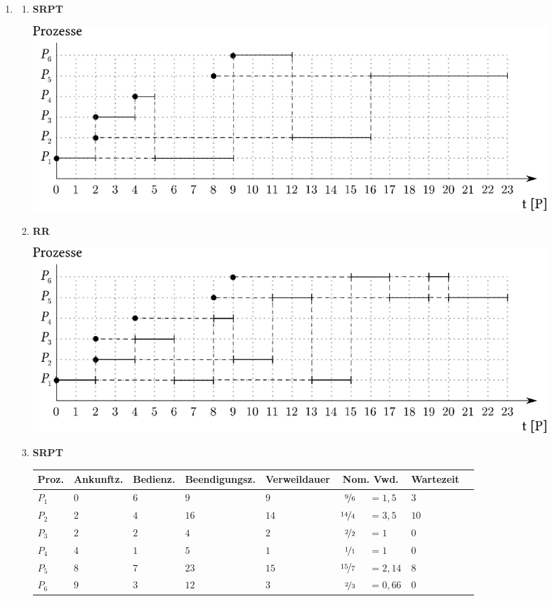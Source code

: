 \newcommand\BM{\text{BM}}

\begin{enumerate}[label={Aufgabe H\arabic*},start=23]
	\item 
		\begin{enumerate}
			\item \textbf{SRPT} \blanko

				\begin{center}
					\includegraphics[width=0.9\textwidth]{23a.eps}
				\end{center}
			\item \textbf{RR} \blanko

				\begin{center}
					\includegraphics[width=0.9\textwidth]{23b.eps}
				\end{center}
			\pagebreak
			\item \textbf{SRPT}
				\vspace{1em}
				\begin{center}
					\small
					\renewcommand*{\arraystretch}{1.2}
					\begin{tabular}{@{}lllllr@{}lll@{}}
						\toprule
						{\footnotesize Proz.} & {\footnotesize Ankunftz.} & {\footnotesize Bedienz.} & {\footnotesize Beendigungsz.} & {\footnotesize Verweildauer} & \multicolumn{2}{c}{\footnotesize Nom. Vwd.} & {\footnotesize Wartezeit} \\ 
						\midrule
						$P_1$ & $0$ & $6$ & $9$ & $9$ & $\nicefrac{9}{6}~$&$=1,5$ & $3$ \\
						$P_2$ & $2$ & $4$ & $16$ & $14$ & $\nicefrac{14}{4}~$&$=3,5$ & $10$ \\
						$P_3$ & $2$ & $2$ & $4$ & $2$ & $\nicefrac{2}{2}~$&$=1$ & $0$ \\
						$P_4$ & $4$ & $1$ & $5$ & $1$ & $\nicefrac{1}{1}~$&$=1$ & $0$ \\
						$P_5$ & $8$ & $7$ & $23$ & $15$ & $\nicefrac{15}{7}~$&$=2,14$ & $8$ \\
						$P_6$ & $9$ & $3$ & $12$ & $3$ & $\nicefrac{2}{3}~$&$=0,66$ & $0$ \\
						\bottomrule
					\end{tabular}
				\end{center}
				\vspace{1em}


\end{enumerate}
\end{enumerate}

